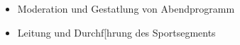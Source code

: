\medskip

\begin{itemize}[noitemsep,leftmargin=3.5mm,rightmargin=0mm,topsep=6pt]
  \item Moderation und Gestatlung von Abendprogramm
  \item Leitung und Durchf[hrung des Sportsegments  
\end{itemize}

\vspace*{\fill}


